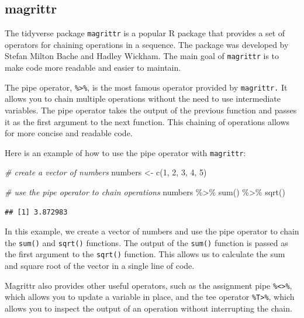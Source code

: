 \documentclass[
]{book}
\newenvironment{Shaded}{\begin{snugshade}}{\end{snugshade}}
\newcommand{\CommentTok}[1]{\textcolor[rgb]{0.56,0.35,0.01}{\textit{#1}}}
\newcommand{\DecValTok}[1]{\textcolor[rgb]{0.00,0.00,0.81}{#1}}
\newcommand{\FunctionTok}[1]{\textcolor[rgb]{0.00,0.00,0.00}{#1}}
\newcommand{\NormalTok}[1]{#1}
\newcommand{\OtherTok}[1]{\textcolor[rgb]{0.56,0.35,0.01}{#1}}
\newcommand{\SpecialCharTok}[1]{\textcolor[rgb]{0.00,0.00,0.00}{#1}}
\begin{document}
\hypertarget{magrittr}{%
\subsection*{magrittr}\label{magrittr}}

The tidyverse package \texttt{magrittr} is a popular R package that provides a set of operators for chaining operations in a sequence. The package was developed by Stefan Milton Bache and Hadley Wickham. The main goal of \texttt{magrittr} is to make code more readable and easier to maintain.

The pipe operator, \texttt{\%\textgreater{}\%}, is the most famous operator provided by \texttt{magrittr.} It allows you to chain multiple operations without the need to use intermediate variables. The pipe operator takes the output of the previous function and passes it as the first argument to the next function. This chaining of operations allows for more concise and readable code.

Here is an example of how to use the pipe operator with \texttt{magrittr}:

\begin{Shaded}
\begin{Highlighting}[]
\CommentTok{\# create a vector of numbers}
\NormalTok{numbers }\OtherTok{\textless{}{-}} \FunctionTok{c}\NormalTok{(}\DecValTok{1}\NormalTok{, }\DecValTok{2}\NormalTok{, }\DecValTok{3}\NormalTok{, }\DecValTok{4}\NormalTok{, }\DecValTok{5}\NormalTok{)}

\CommentTok{\# use the pipe operator to chain operations}
\NormalTok{numbers }\SpecialCharTok{\%\textgreater{}\%}
  \FunctionTok{sum}\NormalTok{() }\SpecialCharTok{\%\textgreater{}\%}
  \FunctionTok{sqrt}\NormalTok{()}
\end{Highlighting}
\end{Shaded}

\begin{verbatim}
## [1] 3.872983
\end{verbatim}

In this example, we create a vector of numbers and use the pipe operator to chain the \texttt{sum()} and \texttt{sqrt()} functions. The output of the \texttt{sum()} function is passed as the first argument to the \texttt{sqrt()} function. This allows us to calculate the sum and square root of the vector in a single line of code.

Magrittr also provides other useful operators, such as the assignment pipe \texttt{\%\textless{}\textgreater{}\%}, which allows you to update a variable in place, and the tee operator \texttt{\%T\textgreater{}\%}, which allows you to inspect the output of an operation without interrupting the chain.
\end{document}
